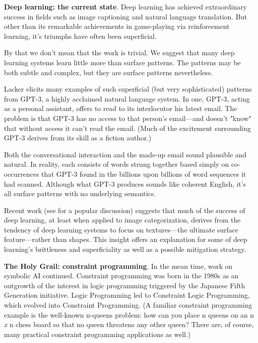 \smallv\noindent\textbf{Deep learning: the current state}. Deep learning has achieved extraordinary success in fields such as image captioning and natural language translation.\cite{garnelo2019reconciling} But other than its remarkable achievements in game-playing via reinforcement learning\cite{silver2018general}, it's triumphs have often been superficial. 

By that we don't mean that the work is trivial. We suggest that many deep learning systems learn little more than surface patterns. The patterns may be both subtle and complex, but they are surface patterns nevertheless.

Lacker\cite{lacker-gpt3} elicits many examples of such superficial (but very sophisticated) patterns from GPT-3\cite{brown2020language}, a highly acclaimed natural language system. In one, GPT-3, acting as a personal assistant, offers to read to its interlocutor his latest email. The problem is that GPT-3 has no access to that person's email---and doesn't "know" that without access it can't read the email. (Much of the excitement surrounding GPT-3 derives from its skill as a fiction author.) 

Both the conversational interaction and the made-up email sound plausible and natural. In reality, each consists of words strung together based simply on co-occurrences that GPT-3 found in the billions upon billions of word sequences it had scanned. Although what GPT-3 produces sounds like coherent English, it's all surface patterns with no underlying semantics.

Recent work\cite{geirhos2018imagenet} (see \cite{Cepelewicz-textures-2020} for a popular discussion) suggests that much of the success of deep learning, at least when applied to image categorization, derives from the tendency of deep learning systems to focus on textures---the ultimate surface feature---rather than shapes.  This insight offers an explanation for some of deep learning's brittleness and superficiality as well as a possible mitigation strategy.

\smallv\noindent\textbf{The Holy Grail: constraint programming}. In the mean time, work on symbolic AI continued. Constraint programming was born in the 1980s as an outgrowth of the interest in logic programming triggered by the Japanese Fifth Generation initiative.\cite{shapiro1983fifth} Logic Programming led to Constraint Logic Programming, which evolved into Constraint Programming. (A familiar constraint programming example is the well-known n-queens problem: how can you place n queens on an n \textit{x} n chess board so that no queen threatens any other queen? There are, of course, many practical constraint programming applications as well.)

